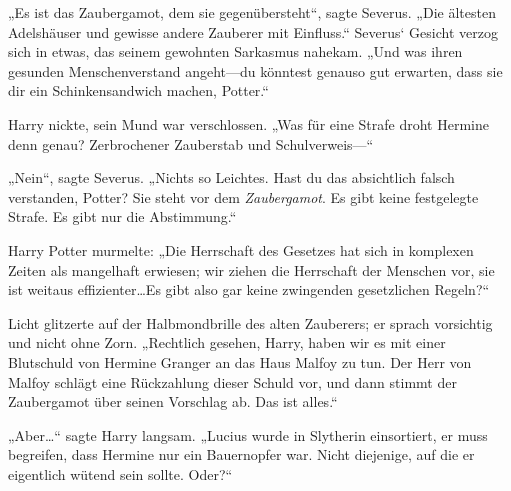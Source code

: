 „Es ist das Zaubergamot, dem sie gegenübersteht“, sagte Severus. „Die ältesten Adelshäuser und gewisse andere Zauberer mit Einfluss.“
Severus‘ Gesicht verzog sich in etwas, das seinem gewohnten Sarkasmus nahekam. „Und was ihren gesunden Menschenverstand angeht—du könntest genauso gut erwarten, dass sie dir ein Schinkensandwich machen, Potter.“

Harry nickte, sein Mund war verschlossen.
„Was für eine Strafe droht Hermine denn genau? Zerbrochener Zauberstab und Schulverweis—“

„Nein“, sagte Severus. „Nichts so Leichtes. Hast du das absichtlich falsch verstanden, Potter? Sie steht vor dem \emph{Zaubergamot}. Es gibt keine festgelegte Strafe. Es gibt nur die Abstimmung.“

Harry Potter murmelte: „Die Herrschaft des Gesetzes hat sich in komplexen Zeiten als mangelhaft erwiesen; wir ziehen die Herrschaft der Menschen vor, sie ist weitaus effizienter…Es gibt also gar keine zwingenden gesetzlichen Regeln?“

Licht glitzerte auf der Halbmondbrille des alten Zauberers; er sprach vorsichtig und nicht ohne Zorn. „Rechtlich gesehen, Harry, haben wir es mit einer Blutschuld von Hermine Granger an das Haus Malfoy zu tun. Der Herr von Malfoy schlägt eine Rückzahlung dieser Schuld vor, und dann stimmt der Zaubergamot über seinen Vorschlag ab. Das ist alles.“

„Aber…“ sagte Harry langsam. „Lucius wurde in Slytherin einsortiert, er muss begreifen, dass Hermine nur ein Bauernopfer war. Nicht diejenige, auf die er eigentlich wütend sein sollte. Oder?“

